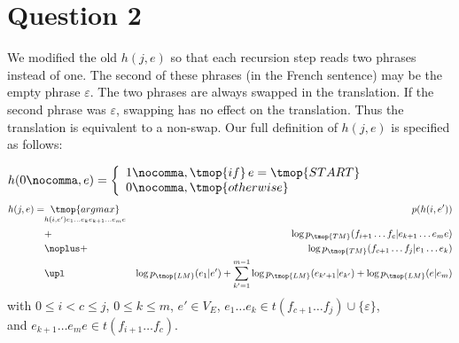 \section{Question 2}

We modified the old $h(j,e)$ so that each recursion step reads two phrases
instead of one. The second of these phrases (in the French sentence) may be
the empty phrase $\varepsilon$. The two phrases are always swapped in the
translation. If the second phrase was $\varepsilon$, swapping has no effect
on the translation. Thus the translation is equivalent to a non-swap.
Our full definition of $h(j,e)$ is specified as follows:

$h (0 \nocomma, e) = \left\{ \begin{array}{l}
  1 \nocomma, \tmop{if} \, e = \tmop{START}\\
  0 \nocomma, \tmop{otherwise}
\end{array} \right.$
\begin{eqnarray}
  h (j, e) = & \underset{h (i, e') e_1 \ldots e_k e_{k + 1} \ldots e_m
  e}{\tmop{argmax}}_{} & p (h (i, e')) \nonumber\\
  & + & \log p_{\tmop{TM}} (f_{i + 1} \ldots f_c |e_{k + 1} \ldots e_m e)
  \nonumber\\
  & \noplus + & \log p_{\tmop{TM}} (f_{c + 1} \ldots f_j |e_1 \ldots e_k)
  \nonumber\\
  & \upl & \log p_{\tmop{LM}} (e_1 |e') + \sum_{k' = 1}^{m - 1} \log
  p_{\tmop{LM}} (e_{k' + 1} |e_{k'}) + \log p_{\tmop{LM}} (e|e_m) \nonumber
\end{eqnarray}
with $0 \leq i < c \leq j$, $0 \leq k \leq m$, $e' \in V_E$, $e_1 \ldots e_k
\in t (f_{c + 1} \ldots f_j) \cup \{ \varepsilon \}$,\\
and $e_{k + 1} \ldots e_m e \in t (f_{i + 1} \ldots f_c)$.
